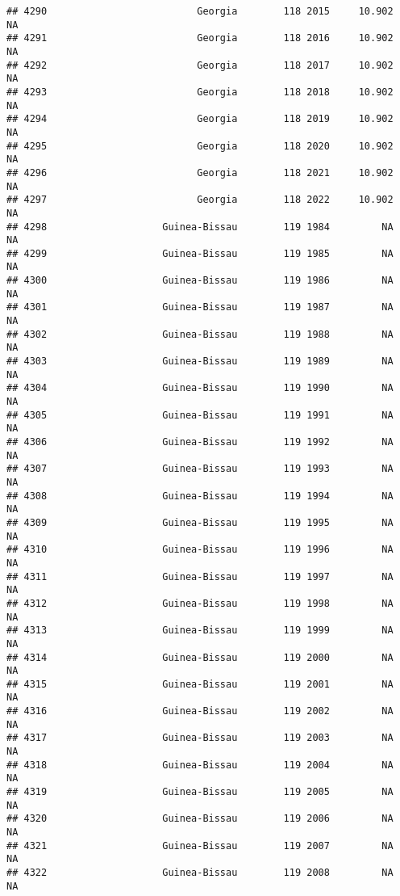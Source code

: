 \documentclass[
]{article}
\begin{document}
\begin{verbatim}
## 4290                          Georgia        118 2015     10.902         NA
## 4291                          Georgia        118 2016     10.902         NA
## 4292                          Georgia        118 2017     10.902         NA
## 4293                          Georgia        118 2018     10.902         NA
## 4294                          Georgia        118 2019     10.902         NA
## 4295                          Georgia        118 2020     10.902         NA
## 4296                          Georgia        118 2021     10.902         NA
## 4297                          Georgia        118 2022     10.902         NA
## 4298                    Guinea-Bissau        119 1984         NA         NA
## 4299                    Guinea-Bissau        119 1985         NA         NA
## 4300                    Guinea-Bissau        119 1986         NA         NA
## 4301                    Guinea-Bissau        119 1987         NA         NA
## 4302                    Guinea-Bissau        119 1988         NA         NA
## 4303                    Guinea-Bissau        119 1989         NA         NA
## 4304                    Guinea-Bissau        119 1990         NA         NA
## 4305                    Guinea-Bissau        119 1991         NA         NA
## 4306                    Guinea-Bissau        119 1992         NA         NA
## 4307                    Guinea-Bissau        119 1993         NA         NA
## 4308                    Guinea-Bissau        119 1994         NA         NA
## 4309                    Guinea-Bissau        119 1995         NA         NA
## 4310                    Guinea-Bissau        119 1996         NA         NA
## 4311                    Guinea-Bissau        119 1997         NA         NA
## 4312                    Guinea-Bissau        119 1998         NA         NA
## 4313                    Guinea-Bissau        119 1999         NA         NA
## 4314                    Guinea-Bissau        119 2000         NA         NA
## 4315                    Guinea-Bissau        119 2001         NA         NA
## 4316                    Guinea-Bissau        119 2002         NA         NA
## 4317                    Guinea-Bissau        119 2003         NA         NA
## 4318                    Guinea-Bissau        119 2004         NA         NA
## 4319                    Guinea-Bissau        119 2005         NA         NA
## 4320                    Guinea-Bissau        119 2006         NA         NA
## 4321                    Guinea-Bissau        119 2007         NA         NA
## 4322                    Guinea-Bissau        119 2008         NA         NA

\end{verbatim}
\end{document}
